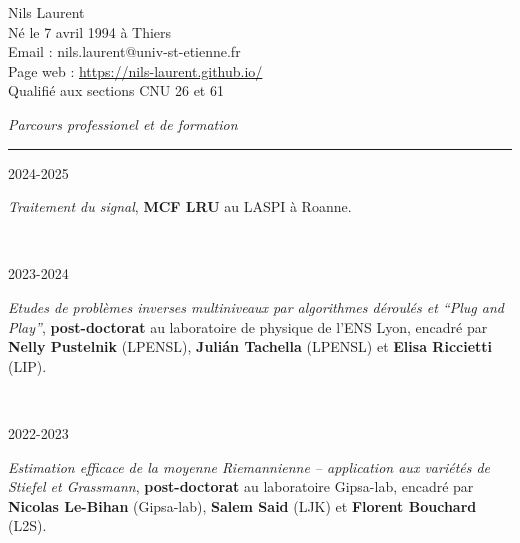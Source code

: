 
{\color{DefaultGray}
	\noindent
	Nils Laurent\\
	Né le 7 avril 1994 à Thiers\\
	Email : nils.laurent@univ-st-etienne.fr\\
	Page web : \url{https://nils-laurent.github.io/}\\
	Qualifié aux sections CNU 26 et 61\\
	\vspace{5mm}
	
	\noindent
	\textit{\Large \color{MyGray} \hspace{5mm} Parcours professionel et de formation}
	\vspace{2mm}
	{\color{DefaultGray}\hrule height .1pt}
	\vspace{4mm}
	
	\noindent
	\begin{minipage}{0.20\textwidth}
		\color{MyGray} 2024-2025
	\end{minipage}
	\hfill
	\begin{minipage}{0.70\textwidth}
		\emph{Traitement du signal}, \textbf{MCF LRU} au LASPI à Roanne.
	\end{minipage}\\
	\vspace{2mm}
	
	\noindent
	\begin{minipage}{0.20\textwidth}
		\color{MyGray} 2023-2024
	\end{minipage}
	\hfill
	\begin{minipage}{0.70\textwidth}
		\emph{Etudes de problèmes inverses multiniveaux par algorithmes déroulés et ``Plug and Play''}, \textbf{post-doctorat} au laboratoire de physique de l'ENS Lyon, encadré par \textbf{Nelly Pustelnik} (LPENSL), \textbf{Julián Tachella} (LPENSL) et \textbf{Elisa Riccietti} (LIP).
	\end{minipage}\\
	\vspace{2mm}
	
	\noindent
	\begin{minipage}{0.20\textwidth}
		\color{MyGray} 2022-2023
	\end{minipage}
	\hfill
	\begin{minipage}{0.70\textwidth}
		\emph{Estimation efficace de la moyenne Riemannienne -- application aux variétés de Stiefel et Grassmann}, \textbf{post-doctorat} au laboratoire Gipsa-lab, encadré par \textbf{Nicolas Le-Bihan} (Gipsa-lab), \textbf{Salem Said} (LJK) et \textbf{Florent Bouchard} (L2S).
	\end{minipage}\\
	\vspace{2mm}
	
}
